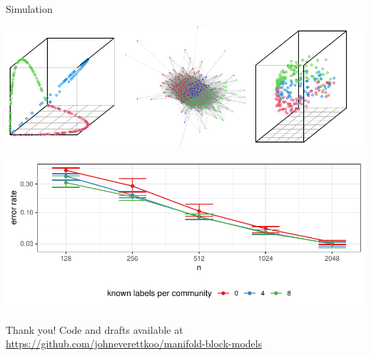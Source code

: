 \documentclass[
  ignorenonframetext,
]{beamer}
\begin{document}
\begin{frame}{Simulation}
\protect\hypertarget{simulation}{}
\begin{center}\includegraphics[width=1\linewidth]{slides_files/figure-beamer/three-curves-1} \end{center}

\begin{center}\includegraphics[width=1\linewidth]{slides_files/figure-beamer/sim-curves-3-1} \end{center}
\end{frame}

\begin{frame}{Thank you!}
\protect\hypertarget{thank-you}{}
Code and drafts available at
\url{https://github.com/johneverettkoo/manifold-block-models}
\end{frame}
\end{document}
